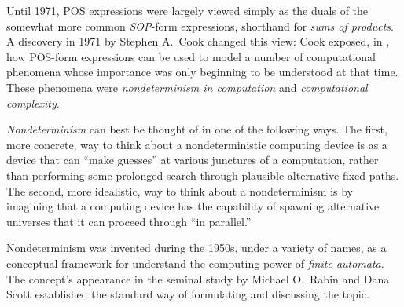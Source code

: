 {\bigskip


Until 1971, POS expressions were largely viewed simply as the duals of the somewhat more common {\it SOP}-form expressions, shorthand for {\it sums of products}.   A discovery in 1971 by Stephen A.~Cook changed this view: Cook exposed, in \cite{Cook71}, how POS-form expressions can be used to model a number of computational phenomena whose importance
was only beginning to be understood at that time.  These phenomena were {\it nondeterminism in computation} and {\it computational complexity}.

\medskip

{\it Nondeterminism} can best be thought of in one of the following ways.  The first, more concrete, way to think about a nondeterministic computing device is as a device that can ``make guesses'' at various junctures of a computation, rather than performing some prolonged search through plausible alternative fixed paths.  The second, more idealistic, way to think about a nondeterminism is by imagining that a computing device has the capability of spawning alternative universes that it can proceed through ``in parallel.''

\bigskip

\noindent {}
\bigskip

   
 
\noindent 
Nondeterminism was invented during the 1950s, under a variety of names, as a conceptual framework for understand the computing power of {\it finite automata}.  The concept's
appearance in the seminal study \cite{RabinS59} by Michael O.~Rabin and Dana Scott
established the standard way of formulating and discussing the topic.

\medskip

}
